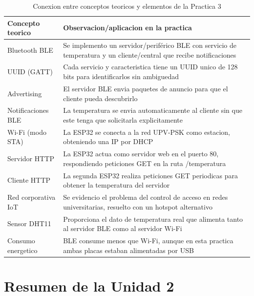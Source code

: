 \begin{table}[htbp]
\centering
\small
\caption{Conexion entre conceptos teoricos y elementos de la Practica 3}
\begin{tabularx}{\textwidth}{@{}lX@{}}
\toprule
\textbf{Concepto teorico} & \textbf{Observacion/aplicacion en la practica} \\
\midrule
Bluetooth BLE & Se implemento un servidor/periférico BLE con servicio de temperatura y un cliente/central que recibe notificaciones \\
UUID (GATT) & Cada servicio y caracteristica tiene un UUID unico de 128 bits para identificarlos sin ambiguedad \\
Advertising & El servidor BLE envia paquetes de anuncio para que el cliente pueda descubrirlo \\
Notificaciones BLE & La temperatura se envia automaticamente al cliente sin que este tenga que solicitarla explicitamente \\
Wi-Fi (modo STA) & La ESP32 se conecta a la red UPV-PSK como estacion, obteniendo una IP por DHCP \\
Servidor HTTP & La ESP32 actua como servidor web en el puerto 80, respondiendo peticiones GET en la ruta /temperatura \\
Cliente HTTP & La segunda ESP32 realiza peticiones GET periodicas para obtener la temperatura del servidor \\
Red corporativa IoT & Se evidencio el problema del control de acceso en redes universitarias, resuelto con un hotspot alternativo \\
Sensor DHT11 & Proporciona el dato de temperatura real que alimenta tanto al servidor BLE como al servidor Wi-Fi \\
Consumo energetico & BLE consume menos que Wi-Fi, aunque en esta practica ambas placas estaban alimentadas por USB \\
\bottomrule
\end{tabularx}
\end{table}


\section{Resumen de la Unidad 2}

